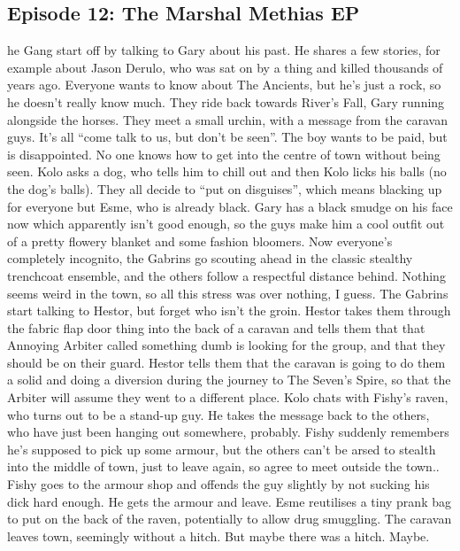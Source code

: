 \subsection{Episode 12: The Marshal Methias EP}
he Gang start off by talking to Gary about his past.\medskip
He shares a few stories, for example about Jason Derulo, who was sat on by a thing and killed thousands of years ago. Everyone wants to know about The Ancients, but he’s just a rock, so he doesn’t really know much.\medskip
They ride back towards River’s Fall, Gary running alongside the horses.\medskip
They meet a small urchin, with a message from the caravan guys. It’s all “come talk to us, but don’t be seen”. The boy wants to be paid, but is disappointed.\medskip
No one knows how to get into the centre of town without being seen. Kolo asks a dog, who tells him to chill out and then Kolo licks his balls (no the dog’s balls).\medskip
They all decide to “put on disguises”, which means blacking up for everyone but Esme, who is already black. Gary has a black smudge on his face now which apparently isn’t good enough, so the guys make him a cool outfit out of a pretty flowery blanket and some fashion bloomers.\medskip
Now everyone’s completely incognito, the Gabrins go scouting ahead in the classic stealthy trenchcoat ensemble, and the others follow a respectful distance behind.\medskip
Nothing seems weird in the town, so all this stress was over nothing, I guess.\medskip
The Gabrins start talking to Hestor, but forget who isn’t the groin.\medskip
Hestor takes them through the fabric flap door thing into the back of a caravan and tells them that that Annoying Arbiter called something dumb is looking for the group, and that they should be on their guard.\medskip
Hestor tells them that the caravan is going to do them a solid and doing a diversion during the journey to The Seven’s Spire, so that the Arbiter will assume they went to a different place.\medskip
Kolo chats with Fishy’s raven, who turns out to be a stand-up guy. He takes the message back to the others, who have just been hanging out somewhere, probably.\medskip
Fishy suddenly remembers he’s supposed to pick up some armour, but the others can’t be arsed to stealth into the middle of town, just to leave again, so agree to meet outside the town..\medskip
Fishy goes to the armour shop and offends the guy slightly by not sucking his dick hard enough. He gets the armour and leave.\medskip
Esme reutilises a tiny prank bag to put on the back of the raven, potentially to allow drug smuggling.\medskip
The caravan leaves town, seemingly without a hitch. But maybe there was a hitch. Maybe.\medskip
